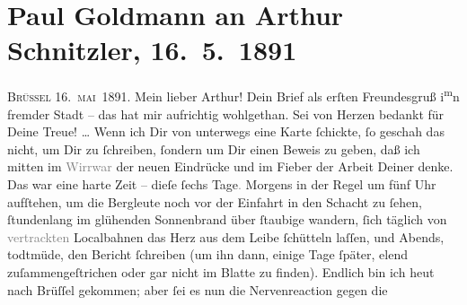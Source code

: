 

               \section[Paul Goldmann an Arthur Schnitzler, 16. 5. 1891]{ Paul Goldmann an Arthur Schnitzler, 16. 5. 1891}\nopagebreak{}\rehead{ }\begin{ledgroupsized}[t]{13cm}\normalsize\beginnumbering{} \toendnotes[C]{\smallbreak\pagebreak[2]} 
\toendnotes[C]{\smallbreak}\pstart
           \centering{}{\pb}\textsc{Brüssel}{ }16. \textsc{mai} 1891.\pend
           \pstart\center{}Mein lieber Arthur!\pend\pstart
           Dein Brief als erſten Freundesgruß i\substVorne{}\textsuperscript{m}\substDazwischen{}n\substHinten{} fremder Stadt – das
               hat mir aufrichtig wohlgethan. Sei von Herzen bedankt für Deine Treue! {\dots} Wenn ich Dir von unterwegs eine Karte ſchickte, ſo
               geschah das nicht, um Dir zu ſchreiben, ſondern um Dir einen Beweis zu geben, daß ich
               mitten im \textcolor{gray}{Wirrwar} der neuen Eindrücke und im Fieber der Arbeit
               Deiner denke. Das war eine harte Zeit – dieſe ſechs Tage\textcolor{gray}{.} Morgens
               in der Regel um fünf Uhr aufſtehen, um die Bergleute noch vor der Einfahrt in den
               Schacht zu ſehen, ſtundenlang im glühenden Sonnenbrand über ſtaubige \label{K_L02663-5v}\label{K_L02663-5h} wandern,
               ſich täglich von \textcolor{gray}{vertrackten} Localbahnen das Herz aus dem Leibe
               ſchütteln laſſen, und Abends, todtmüde, den Bericht ſchreiben (um ihn dann\strikeout{)}, einige Tage ſpäter, elend zuſammengeſtrichen oder
               gar nicht im Blatte zu
               finden). Endlich  bin ich heut nach Brüſſel gekommen; aber ſei es nun die Nervenreaction gegen die

\end{ledgroupsized}
